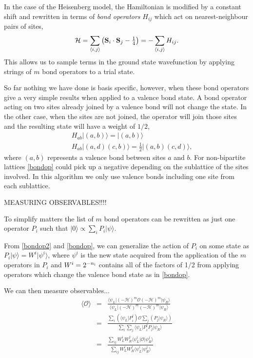 \documentclass[prb,aps,twocolumn,floatfix,amsmath,amssymb,superscriptaddress,tightenlines]{revtex4}
\begin{document}
In the case of the Heisenberg model, the Hamiltonian is modified by a constant shift and rewritten in terms of {\it bond operators} $H_{ij}$ which act on nearest-neighbour pairs of sites,
\begin{equation}
	 \mathcal{H} = \sum_{\langle i,j \rangle} \left({\bf S}_i \cdot {\bf S}_j - \tfrac{1}{4}\right) =  -\sum_{\langle i,j \rangle} H_{ij}.
\end{equation}
This allows us to sample terms in the ground state wavefunction by applying strings of $m$ bond operators to a trial state.

So far nothing we have done is basis specific, however, when these bond operators give a very simple results when applied to a valence bond state.  A bond operator acting on two sites already joined by a valence bond will not change the state.  In the other case, when the sites are not joined, the operator will join those sites and the resulting state will have a weight of $1/2$,
\begin{eqnarray}
	&&H_{ab}\lvert (a,b) \rangle=  \lvert (a,b) \rangle \label{bondop2}\\ 
	&&H_{ab}\lvert (a,d)(c,b) \rangle =  \tfrac{1}{2}\lvert (a,b)(c,d) \rangle, \label{bondop}
\end{eqnarray}
where $(a,b)$ represents a valence bond between sites $a$ and $b$.  
For non-bipartite lattices \eqref{bondop} could pick up a negative depending on the sublattice of the sites involved.  In this algorithm we only use valence bonds including one site from each sublattice.

MEASURING OBSERVABLES!!!!  

To simplify matters the list of $m$ bond operators can be rewritten as just one operator $P_i$ such that $\lvert 0 \rangle \propto \sum_i P_i \lvert \psi\rangle$.

From \eqref{bondop2} and \eqref{bondop}, we can generalize the action of $P_i$ on some state as $P_i \lvert \psi\rangle = W^i  \lvert \psi^i\rangle$, where $ \psi^i$ is the new state acquired from the application of the $m$ operators in $P_i$ and $W^i = 2^{-n_{\rm i}}$ contains all of the factors of 1/2 from applying operators which change the valence bond state as in \eqref{bondop}.

We can then measure observables...
\begin{eqnarray}
\langle \mathcal{O}\rangle  &=& \frac{ \langle \psi_L \rvert (-\mathcal{H})^m\mathcal{O}(-\mathcal{H})^m \lvert \psi_R \rangle}{ \langle \psi_L \rvert (-\mathcal{H})^m(-\mathcal{H})^m \lvert \psi_R \rangle}  \label{measure}\\
&=& \frac{\sum_i (\langle \psi_L \rvert P_i^{\dagger})\mathcal{O}\sum_j(P_j \lvert \psi_R \rangle)}{\sum_i\sum_j \langle \psi_L \rvert P_i^{\dagger}P_j \lvert \psi_R \rangle} \\
&=&  \frac{\sum_{ij} W_L^iW_R^j\langle \psi_L^i \rvert \mathcal{O}\lvert \psi_R^j \rangle}{\sum_{ij} W_L^iW_R^j\langle \psi_L^i \rvert \psi_R^j \rangle} 
\end{eqnarray}
\end{document}
